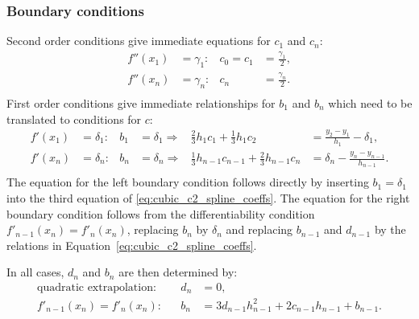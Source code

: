 \documentclass[11pt]{article}
\newcommand{\follows}{\Rightarrow}
\theoremstyle{break}            %
\begin{document}
\subsubsection*{Boundary conditions}
Second order conditions give immediate equations for $c_1$ and $c_n$:
\begin{equation*}
\begin{aligned}
    f''(x_1)&=\gamma_1: & c_0=c_1 & = \frac{\gamma_1}{2},\\
    f''(x_n)&=\gamma_n: & c_n & = \frac{\gamma_n}{2}.\\
\end{aligned}
\end{equation*}
First order conditions give immediate relationships for $b_1$ and $b_n$
which need to be translated to conditions for $c$:
\begin{equation*}
\begin{aligned}
    f'(x_1)&=\delta_1: & b_1&=\delta_1 \follows&
        \frac{2}{3}h_1 c_1 +\frac{1}{3}h_1 c_2
        & = \frac{y_2-y_1}{h_1} -\delta_1,\\
    f'(x_n)&=\delta_n: & b_n&=\delta_n \follows&
        \frac{1}{3}h_{n-1} c_{n-1} +\frac{2}{3}h_{n-1} c_n
        & = \delta_n - \frac{y_n-y_{n-1}}{h_{n-1}}.\\
\end{aligned}
\end{equation*}
The equation for the left boundary condition follows directly by inserting
$b_1=\delta_1$ into the third equation of \eqref{eq:cubic_c2_spline_coeffs}.
The equation for the right boundary condition follows from the
differentiability condition $f'_{n-1}(x_n)  = f'_n(x_n)$, replacing
$b_n$ by $\delta_n$ and replacing $b_{n-1}$ and $d_{n-1}$ by the relations
in Equation~\eqref{eq:cubic_c2_spline_coeffs}.

In all cases, $d_n$ and $b_n$ are then determined by:
\begin{equation*}
\begin{aligned}
    \text{quadratic extrapolation:} & & d_n & = 0,\\
    f'_{n-1}(x_n)  = f'_n(x_n): & & b_n & = 3 d_{n-1} h_{n-1}^2 + 2 c_{n-1} h_{n-1} + b_{n-1}.
\end{aligned}
\end{equation*}
\end{document}
